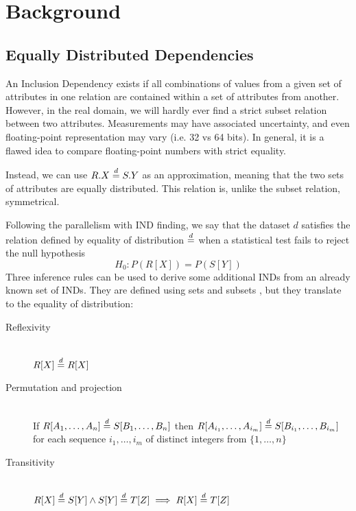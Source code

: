 
\section{Background}
\label{sec:background}

\subsection{Equally Distributed Dependencies}
\label{sec:edd}
An Inclusion Dependency exists if all combinations of
values from a given set of attributes in one relation are contained within
a set of attributes from another.
However, in the real domain, we will hardly ever find a strict
subset relation between two attributes. Measurements may have associated uncertainty,
and even floating-point representation may vary (i.e. 32 vs 64 bits). In general, it is a
flawed idea to compare floating-point numbers with strict equality.

Instead, we can use $R.X \stackrel{d}{=} S.Y$ as an approximation, meaning that the two sets of
attributes are equally distributed. This relation is, unlike the subset relation, symmetrical.

Following the parallelism with IND finding, we say that the dataset $d$ satisfies
the relation defined by equality of distribution $\stackrel{d}{=}$ when a statistical test
fails to reject the null hypothesis
\begin{equation}
    H_0: P(R[X]) = P(S[Y])
    \label{eq:eqdist}
\end{equation}
Three inference rules can be used to derive some additional INDs from an already known
set of INDs. They are defined using sets and subsets \cite{Casanova1984},
but they translate to the equality of distribution:

\begin{description}
    \item[Reflexivity] \hfill \\
        $R[X] \stackrel{d}{=} R[X]$
    \item[Permutation and projection] \hfill \\
        If $R[A_1,\dots,A_n] \stackrel{d}{=} S[B_1,\dots,B_n]$ then
        $R[A_{i_1},\dots,A_{i_m}] \stackrel{d}{=} S[B_{i_1},\dots,B_{i_m}]$ for each sequence
        $i_1,\dots,i_m$ of distinct integers from $\{1,\dots,n\}$
    \item[Transitivity] \hfill \\
        $ R[X] \stackrel{d}{=} S[Y] \land S[Y] \stackrel{d}{=} T[Z] \implies R[X] \stackrel{d}{=} T[Z]$
\end{description}

